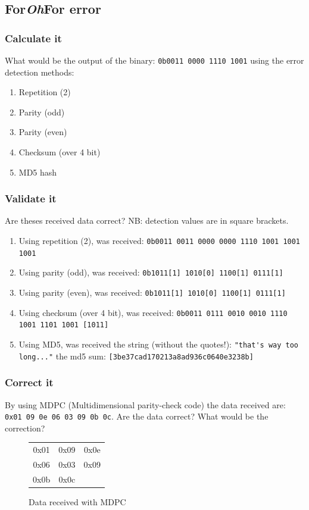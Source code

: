 \documentclass[11pt]{article}
\begin{document}
\subsection{For\emph{Oh}For error}
\subsubsection{Calculate it}
What would be the output of the binary: \verb$0b0011 0000 1110 1001$ using the error detection methods:
  \begin{enumerate}
    \item Repetition (2)
    \item Parity (odd)
    \item Parity (even)
    \item Checksum (over 4 bit)
    \item MD5 hash
  \end{enumerate}

\subsubsection{Validate it}
Are theses received data correct? NB: detection values are in square brackets.
  \begin{enumerate}
    \item Using repetition (2), was received: \verb$0b0011 0011 0000 0000 1110 1001 1001 1001$
    \item Using parity (odd), was received: \verb$0b1011[1] 1010[0] 1100[1] 0111[1]$
    \item Using parity (even), was received: \verb$0b1011[1] 1010[0] 1100[1] 0111[1]$
    \item Using checksum (over 4 bit), was received: \verb$0b0011 0111 0010 0010 1110 1001 1101 1001 [1011]$
    \item Using MD5, was received the string (without the quotes!): \verb$"that's way too long..."$ the md5 sum: \verb$[3be37cad170213a8ad936c0640e3238b]$
  \end{enumerate}


\subsubsection{Correct it}
By using MDPC (Multidimensional parity-check code) the data received are: \verb$0x01 09 0e 06 03 09 0b 0c$. Are the data correct? What would be the correction? \\
  \begin{figure}[h]
    \centering
    \begin{tabular}{cc|c}
      0x01 & 0x09 & 0x0e \\
      0x06 & 0x03 & 0x09 \\ \hline
      0x0b & 0x0c &
    \end{tabular}
    \caption{Data received with MDPC}
    \label{fig:ami}
  \end{figure}
\end{document}
